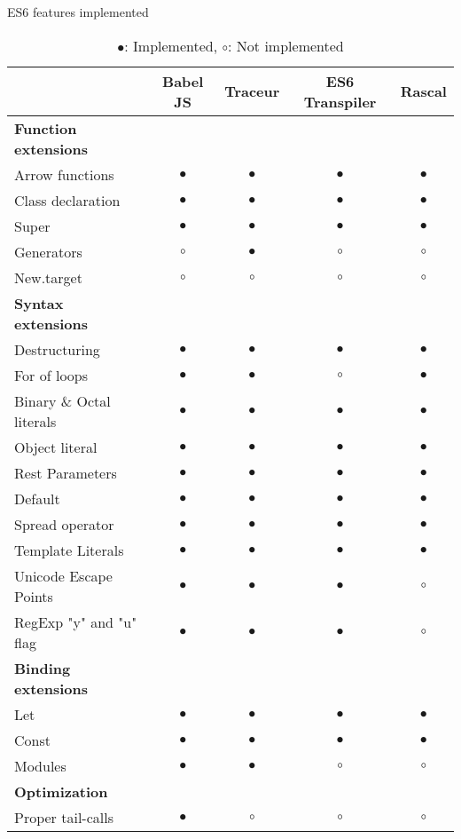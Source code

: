 \begin{table}[h!]
\centering
\caption{ES6 features implemented}
\begin{tabular}{@{}l|cccc@{}}
\toprule
{} & \textbf{Babel JS} & \textbf{Traceur} & \textbf{ES6 Transpiler} & \textbf{Rascal} \\ \midrule
{\bf Function extensions} & & & & \\ 
{Arrow functions}   & $\bullet$ & $\bullet$ & $\bullet$ & $\bullet$ \\
{Class declaration} & $\bullet$ & $\bullet$ & $\bullet$ & $\bullet$ \\
{Super}             & $\bullet$ & $\bullet$ & $\bullet$ & $\bullet$ \\
{Generators}        & $\circ$ & $\bullet$ & $\circ$ & $\circ$ \\
{New.target}        & $\circ$ & $\circ$ & $\circ$ & $\circ$ \\ \midrule

{\bf Syntax extensions} & & & & \\ 
{Destructuring}            & $\bullet$ & $\bullet$ & $\bullet$ & $\bullet$ \\
{For of loops}             & $\bullet$ & $\bullet$ & $\circ$ & $\bullet$ \\
{Binary \& Octal literals} & $\bullet$ & $\bullet$ & $\bullet$ & $\bullet$ \\
{Object literal}           & $\bullet$ & $\bullet$ & $\bullet$& $\bullet$ \\
{Rest Parameters}          & $\bullet$ & $\bullet$ & $\bullet$ & $\bullet$ \\
{Default}                  & $\bullet$ & $\bullet$ & $\bullet$ & $\bullet$ \\
{Spread operator}          & $\bullet$ & $\bullet$ & $\bullet$ & $\bullet$ \\
{Template Literals}        & $\bullet$ & $\bullet$ & $\bullet$ & $\bullet$ \\
{Unicode Escape Points}    & $\bullet$ & $\bullet$ & $\bullet$ & $\circ$ \\
{RegExp "y" and "u" flag}  & $\bullet$ & $\bullet$ & $\bullet$ & $\circ$ \\ \midrule

{\bf Binding extensions} & & & & \\ 
{Let}     & $\bullet$ & $\bullet$ & $\bullet$ & $\bullet$ \\
{Const}   & $\bullet$ & $\bullet$ & $\bullet$ & $\bullet$ \\
{Modules} & $\bullet$ & $\bullet$ & $\circ$ & $\circ$ \\ \midrule

{\bf Optimization} & & & & \\
{Proper tail-calls} & $\bullet$ & $\circ$ & $\circ$ & $\circ$ \\ \bottomrule
\end{tabular}
\caption*{$\bullet$: Implemented, $\circ$: Not implemented}
\end{table}

